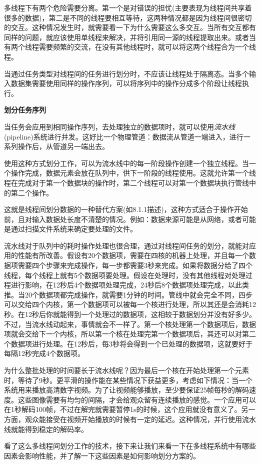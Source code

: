 多线程下有两个危险需要分离。第一个是对错误的担忧(主要表现为线程间共享着很多的数据)，第二是不同的线程要相互等待，这两种情况都是因为线程间很密切的交互。这种情况发生时，就需要看一下为什么需要这么多交互。当所有交互都有同样的问题，就应该使用单线程来解决，并将引用同一源的线程提取出来。或者当有两个线程需要频繁的交流，在没有其他线程时，就可以将这两个线程合为一个线程。

当通过任务类型对线程间的任务进行划分时，不应该让线程处于隔离态。当多个输入数据集需要使用同样的操作序列，可以将序列中的操作分成多个阶段让线程执行。

\textbf{划分任务序列}

当任务会应用到相同操作序列，去处理独立的数据项时，就可以使用\textit{流水线}(pipeline)系统进行并发。这好比一个物理管道：数据流从管道一端进入，进行一系列操作后，从管道另一端出去。

使用这种方式划分工作，可以为流水线中的每一阶段操作创建一个独立线程。当一个操作完成，数据元素会放在队列中，供下一阶段的线程使用。这就允许第一个线程在完成对于第一个数据块的操作时，第二个线程可以对第一个数据块执行管线中的第二个操作。

这就是线程间划分数据的一种替代方案(如8.1.1描述)，这种方式适合于操作开始前，且对输入数据处长度不清楚的情况。例如：数据来源可能是从网络，或者可能是通过扫描文件系统来确定要处理的文件。

流水线对于队列中的耗时操作处理也很合理，通过对线程间任务的划分，就能对应用的性能有所改善。假设有20个数据项，需要在四核的机器上处理，并且每一个数据项需要四个步骤来完成操作，每一步都需要3秒来完成。如果将数据分给了四个线程，每个线程上就有5个数据项要处理。假设在处理时，没有其他线程对处理过程进行影响，在12秒后4个数据项处理完成，24秒后8个数据项处理完成，以此类推。当20个数据项都完成操作，就需要1分钟的时间。管线中就会完全不同，四步可以交给四个内核，第一个数据项可以被每一个核进行处理，所以其还是会消耗12秒。在12秒后你就能得到一个处理过的数据项，这相较于数据划分并没有好多少。不过，当流水线动起来，事情就会不一样了。第一个核处理第一个数据项后，数据项就会交给下一个内核，所以第一个核在处理完第一个数据项后，其还可以对第二个数据项进行处理。在12秒后，每3秒将会得到一个已处理的数据项，这就要好于每隔12秒完成4个数据项。

为什么整批处理的时间要长于流水线呢？因为最后一个核在开始处理第一个元素时，等待了9秒。更平滑的操作能在某些情况下获益更多，考虑如下情况：当一个系统用来播放高清数字视频。为了让视频能够播放，至少要保证25帧每秒的解码速度。这些图像需要有均匀的间隔，才会给观众留有连续播放的感觉。一个应用可以在1秒解码100帧，不过在解完就需要暂停1s的时候，这个应用就没有意义了。另一方面，观众能接受在视频开始播放的时候有一定的延迟。这种情况，并行使用流水线就能得到稳定的解码率。

看了这么多线程间划分工作的技术，接下来让我们来看一下在多线程系统中有哪些因素会影响性能，并了解一下这些因素是如何影响划分方案的。



